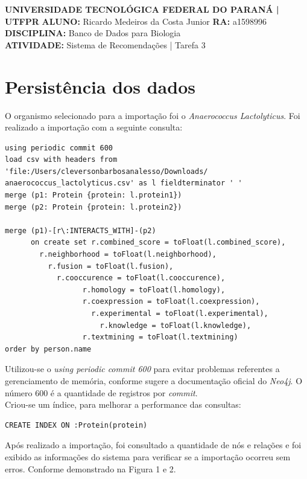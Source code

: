 \documentclass[a4paper, 12pt]{article}
\begin{document}
\noident
\textbf{UNIVERSIDADE TECNOLÓGICA FEDERAL DO PARANÁ | UTFPR}
\textbf{ALUNO:} Ricardo Medeiros da Costa Junior   \textbf{RA:} a1598996 \\
\textbf{DISCIPLINA:} Banco de Dados para Biologia \\
\textbf{ATIVIDADE:} Sistema de Recomendações | Tarefa 3 

\section{Persistência dos dados}
O organismo selecionado para a importação foi o \emph{Anaerococcus Lactolyticus}. Foi realizado a importação com a seguinte consulta:

\begin{lstlisting}[frame=single]
using periodic commit 600
load csv with headers from
'file:/Users/cleversonbarbosanalesso/Downloads/
anaerococcus_lactolyticus.csv' as l fieldterminator ' '
merge (p1: Protein {protein: l.protein1})
merge (p2: Protein {protein: l.protein2})

merge (p1)-[r\:INTERACTS_WITH]-(p2)
      on create set r.combined_score = toFloat(l.combined_score),
        r.neighborhood = toFloat(l.neighborhood),
          r.fusion = toFloat(l.fusion),
            r.cooccurence = toFloat(l.cooccurence),
                  r.homology = toFloat(l.homology),
                  r.coexpression = toFloat(l.coexpression),
                    r.experimental = toFloat(l.experimental),
                      r.knowledge = toFloat(l.knowledge),
                  r.textmining = toFloat(l.textmining)
order by person.name
\end{lstlisting}

Utilizou-se o \emph{using periodic commit 600} para evitar problemas referentes a gerenciamento de memória, conforme sugere a documentação oficial do \emph{Neo4j}. O número 600 é a quantidade de registros por \textit{commit}. \\

Criou-se um índice, para melhorar a performance das consultas:

\begin{lstlisting}[frame=single]
CREATE INDEX ON :Protein(protein)
\end{lstlisting}

Após realizado a importação, foi consultado a quantidade de nós e relações e foi exibido as informações do sistema para verificar se a importação ocorreu sem erros. Conforme demonstrado na Figura 1 e 2.
\end{document}
